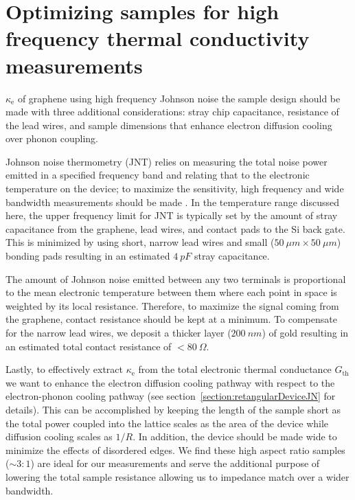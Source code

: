 \section{Optimizing samples for high frequency thermal conductivity measurements}
 $\kappa_{\mathrm{e}}$ of graphene using high frequency Johnson noise the sample design should be made with three additional considerations: stray chip capacitance, resistance of the lead wires, and sample dimensions that enhance electron diffusion cooling over phonon coupling. 

Johnson noise thermometry (JNT) relies on measuring the total noise power emitted in a specified frequency band and relating that to the electronic temperature on the device; to maximize the sensitivity, high frequency and wide bandwidth measurements should be made \cite{crossno_development_2015}. In the temperature range discussed here, the upper frequency limit for JNT is typically set by the amount of stray capacitance from the graphene, lead wires, and contact pads to the Si back gate. This is minimized by using short, narrow lead wires and small ($50~\mu m\times50~\mu m$) bonding pads resulting in an estimated $4~pF$ stray capacitance. 

The amount of Johnson noise emitted between any two terminals is proportional to the mean electronic temperature between them where each point in space is weighted by its local resistance. Therefore, to maximize the signal coming from the graphene, contact resistance should be kept at a minimum. To compensate for the narrow lead wires, we deposit a thicker layer ($200~nm$) of gold resulting in an estimated total contact resistance of $<80~\Omega$.

Lastly, to effectively extract $\kappa_{\mathrm{e}}$ from the total electronic thermal conductance $G_{\mathrm{th}}$ we want to enhance the electron diffusion cooling pathway with respect to the electron-phonon cooling pathway (see section~\ref{section:retangularDeviceJN} for details). This can be accomplished by keeping the length of the sample short as the total power coupled into the lattice scales as the area of the device while diffusion cooling scales as $1/R$. In addition, the device should be made wide to minimize the effects of disordered edges. We find these high aspect ratio samples ($\sim 3:1$) are ideal for our measurements and serve the additional purpose of lowering the total sample resistance allowing us to impedance match over a wider bandwidth.

